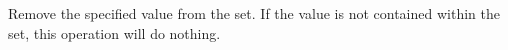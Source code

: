 Remove the specified value from the set.  If the value is not contained within
the set, this operation will do nothing.

